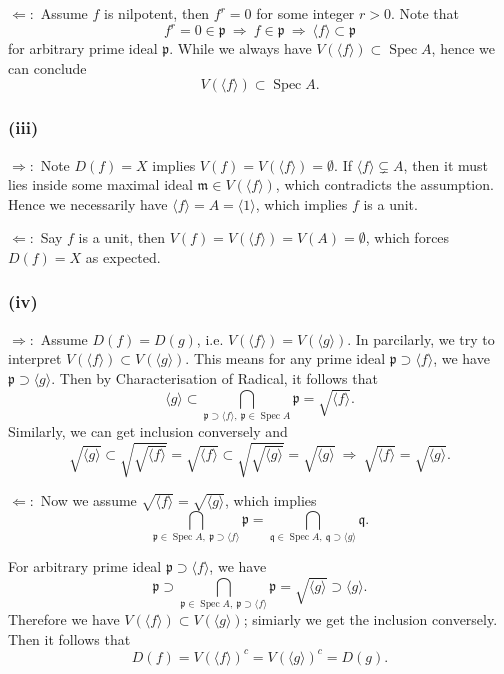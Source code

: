 $\Leftarrow:$ Assume $f$ is nilpotent, then $f^r=0$ for some integer $r>0$. Note that 
$$f^r=0\in\mathfrak p ~\Rightarrow~ f\in\mathfrak p ~\Rightarrow~ \langle f\rangle \subset \mathfrak p$$ for arbitrary prime ideal $\mathfrak p$. While we always have $V(\langle f\rangle)\subset\operatorname{Spec}A$, hence we can conclude $$V(\langle f\rangle)\subset\operatorname{Spec}A.$$
\subsubsection{(iii)}
$\Rightarrow:$ Note $D(f)=X$ implies $V(f)=V(\langle f\rangle)=\emptyset$. If $\langle f\rangle\subsetneq A$, then it must lies inside some maximal ideal $\mathfrak m\in V(\langle f\rangle)$, which contradicts the assumption. Hence we necessarily have $\langle f\rangle =A=\langle 1\rangle$, which implies $f$ is a unit. 

$\Leftarrow:$ Say $f$ is a unit, then $V(f)=V(\langle f\rangle)=V(A)=\emptyset$, which forces $D(f)=X$ as expected. 

\subsubsection{(iv)}
$\Rightarrow:$ Assume $D(f)=D(g)$, i.e. $V(\langle f\rangle)=V(\langle g\rangle)$. In parcilarly, we try to interpret $V(\langle f\rangle)\subset V(\langle g\rangle)$. This means for any prime ideal $\mathfrak p\supset \langle f\rangle$, we have $\mathfrak p\supset \langle g\rangle$. Then by Characterisation of Radical, it follows that $$\langle g\rangle \subset \bigcap_{\mathfrak p\supset \langle f\rangle,~ \mathfrak p\in\operatorname{Spec}A}\mathfrak p= \sqrt{\langle f\rangle}.$$
Similarly, we can get inclusion conversely and 
$$\sqrt{\langle g\rangle}\subset \sqrt{\sqrt{\langle f\rangle}}=\sqrt{\langle f\rangle}\subset \sqrt{\sqrt{\langle g\rangle}}=\sqrt{\langle g\rangle} ~\Rightarrow~ \sqrt{\langle f\rangle}=\sqrt{\langle g\rangle}.$$

$\Leftarrow:$ Now we assume $\sqrt{\langle f\rangle}=\sqrt{\langle g\rangle}$, which implies 
$$\bigcap_{\mathfrak p\in\operatorname{Spec}A,~ \mathfrak p\supset \langle f\rangle}\mathfrak p=\bigcap_{\mathfrak q\in\operatorname{Spec}A,~ \mathfrak q\supset \langle g\rangle}\mathfrak q.$$

For arbitrary prime ideal $\mathfrak p\supset \langle f\rangle$, we have 
$$\mathfrak p\supset \bigcap_{\mathfrak p\in\operatorname{Spec}A,~ \mathfrak p\supset \langle f\rangle}\mathfrak p=\sqrt{\langle g\rangle}\supset \langle g\rangle.$$
Therefore we have $V(\langle f\rangle)\subset V(\langle g\rangle)$; simiarly we get the inclusion conversely. Then it follows that $$D(f)=V(\langle f\rangle)^c=V(\langle g\rangle)^c=D(g).$$
